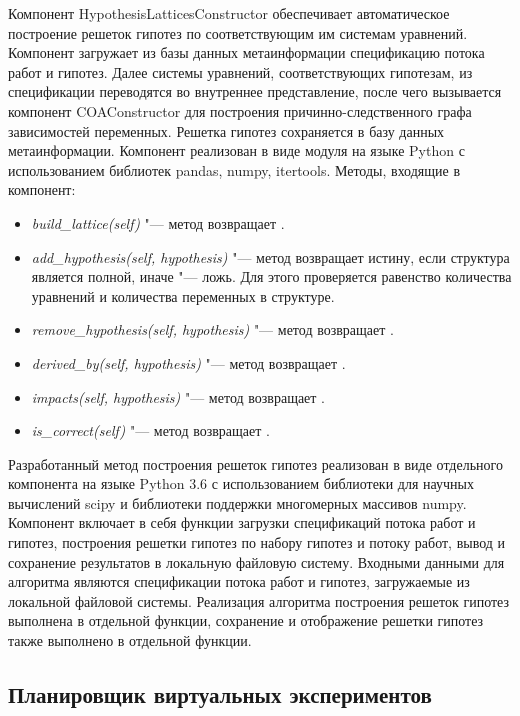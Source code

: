 Компонент HypothesisLatticesConstructor обеспечивает автоматическое построение решеток гипотез по соответствующим 
им системам уравнений. Компонент загружает из базы данных метаинформации спецификацию потока работ и гипотез. 
Далее системы уравнений, соответствующих гипотезам, из спецификации переводятся во внутреннее представление, 
после чего вызывается компонент COAConstructor для построения причинно-следственного графа зависимостей переменных. 
Решетка гипотез сохраняется в базу данных метаинформации. Компонент реализован в виде модуля на языке Python с 
использованием библиотек pandas, numpy, itertools.
Методы, входящие в компонент:
\begin{itemize}
    \item \textit{build\_lattice(self)} "--- метод возвращает . 
    \item \textit{add\_hypothesis(self, hypothesis)} "--- метод возвращает истину, если структура является полной, 
            иначе "--- ложь. Для этого проверяется равенство количества уравнений и количества переменных в структуре.
    \item \textit{remove\_hypothesis(self, hypothesis)} "--- метод возвращает .
    \item \textit{derived\_by(self, hypothesis)} "--- метод возвращает .
    \item \textit{impacts(self, hypothesis)} "--- метод возвращает .
    \item \textit{is\_correct(self)} "--- метод возвращает .
    
\end{itemize}

Разработанный метод построения решеток гипотез реализован в виде отдельного компонента на языке Python 3.6 с 
использованием библиотеки для научных вычислений scipy и библиотеки поддержки многомерных массивов numpy. Компонент 
включает в себя функции загрузки спецификаций потока работ и гипотез, построения решетки гипотез по набору гипотез и 
потоку работ, вывод и сохранение результатов в локальную файловую систему. Входными данными для алгоритма являются 
спецификации потока работ и гипотез, загружаемые из локальной файловой системы. Реализация алгоритма построения 
решеток гипотез выполнена в отдельной функции, сохранение и отображение решетки гипотез также выполнено 
в отдельной функции.

\subsection{Планировщик виртуальных экспериментов}\label{sect_4_2_5}

